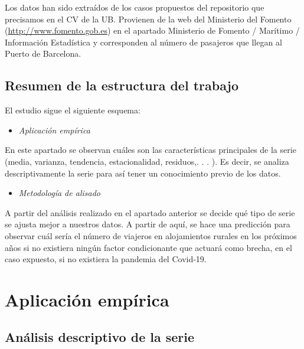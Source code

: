 \documentclass[
]{article}
\providecommand{\tightlist}{%
  \setlength{\itemsep}{0pt}\setlength{\parskip}{0pt}}
\begin{document}
Los datos han sido extraídos de los casos propuestos del repositorio que
precisamos en el CV de la UB. Provienen de la web del Ministerio del
Fomento (\url{http://www.fomento.gob.es}) en el apartado Ministerio de
Fomento / Marítimo / Información Estadística y corresponden al número de
pasajeros que llegan al Puerto de Barcelona.

\hypertarget{resumen-de-la-estructura-del-trabajo}{%
\subsection{Resumen de la estructura del
trabajo}\label{resumen-de-la-estructura-del-trabajo}}

El estudio sigue el siguiente esquema:

\begin{itemize}
\tightlist
\item
  \emph{Aplicación empírica}
\end{itemize}

En este apartado se observan cuáles son las características principales
de la serie (media, varianza, tendencia, estacionalidad, residuos,. . .
). Es decir, se analiza descriptivamente la serie para así tener un
conocimiento previo de los datos.

\begin{itemize}
\tightlist
\item
  \emph{Metodología de alisado}
\end{itemize}

A partir del análisis realizado en el apartado anterior se decide qué
tipo de serie se ajusta mejor a nuestros datos. A partir de aquí, se
hace una predicción para observar cuál sería el número de viajeros en
alojamientos rurales en los próximos años si no existiera ningún factor
condicionante que actuará como brecha, en el caso expuesto, si no
existiera la pandemia del Covid-19.

\medskip

\hypertarget{aplicaciuxf3n-empuxedrica}{%
\section{Aplicación empírica}\label{aplicaciuxf3n-empuxedrica}}

\hypertarget{anuxe1lisis-descriptivo-de-la-serie}{%
\subsection{Análisis descriptivo de la
serie}\label{anuxe1lisis-descriptivo-de-la-serie}}
\end{document}
